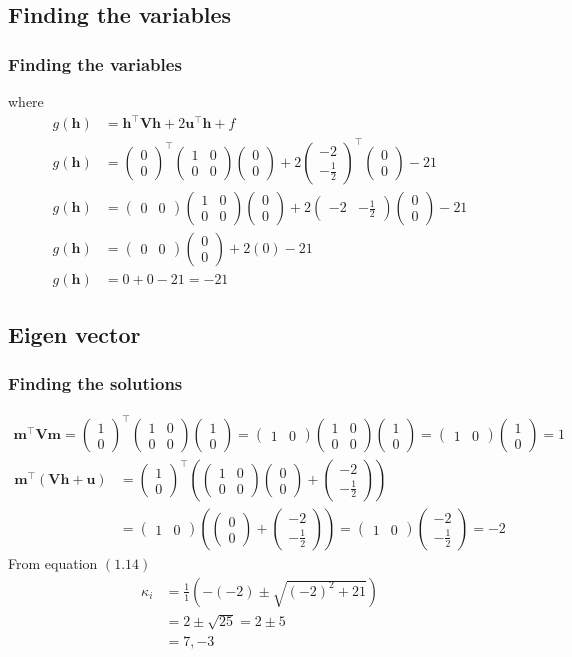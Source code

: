 \documentclass{beamer}
\providecommand{\brak}[1]{\ensuremath{\left(#1\right)}}
\theoremstyle{remark}
\newcommand{\myvec}[1]{\ensuremath{\begin{pmatrix}#1\end{pmatrix}}}
\let\vec\mathbf
\numberwithin{equation}{section}
\begin{document}
 \subsection{Finding the variables}
\begin{frame}
\frametitle{Finding the variables}
where
\begin{align}
g\brak{\vec{h}} &= \vec{h}^\top\vec{V}\vec{h}+2\vec{u}^\top\vec{h}+f \\
g\brak{\vec{h}} &= \myvec{0\\0}^\top\myvec{1&0\\0&0}\myvec{0\\0}+2\myvec{-2\\-\frac{1}{2}}^\top\myvec{0\\0}-21 \\
g\brak{\vec{h}} &= \myvec{0&0}\myvec{1&0\\0&0}\myvec{0\\0}+2\myvec{-2&-\frac{1}{2}}\myvec{0\\0}-21 \\
g\brak{\vec{h}} &= \myvec{0&0}\myvec{0\\0}+2\brak{0}-21 \\
g\brak{\vec{h}} &= 0+0-21=-21
\end{align}
 \end{frame}
\begin{frame}
\subsection{Eigen vector}
\frametitle{Finding the solutions}
  \begin{align}
     \vec{m}^\top \vec{V}\vec{m}=\myvec{1\\0}^\top\myvec{1&0\\0&0}\myvec{1\\0}=\myvec{1&0}\myvec{1&0\\0&0}\myvec{1\\0}=\myvec{1&0}\myvec{1\\0}=1
     \end{align}
 \begin{align}
    \vec{m}^\top\brak{\vec{V}\vec{h}+\vec{u}}
    &= \myvec{1\\0}^\top\brak{\myvec{1&0\\0&0}\myvec{0\\0}+\myvec{-2\\-\frac{1}{2}}} \nonumber \\&=\myvec{1&0}\brak{\myvec{0\\0}+\myvec{-2\\-\frac{1}{2}}}=
    \myvec{1&0}\myvec{-2\\-\frac{1}{2}}=-2
\end{align}
From equation \brak{1.14}
\begin{align}
\kappa_i&= \frac{1}{1}\brak{-\brak{-2}\pm\sqrt{\brak{-2}^2+21}}\\
&=2\pm\sqrt{25}=2\pm5 \\
&=7,-3
\end{align}
\end{frame}
\end{document}
